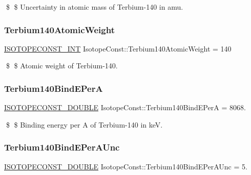 \$ \$ Uncertainty in atomic mass of Terbium-\/140 in amu. \mbox{\label{group___isotope_const-_terbium-_tb140_gac3b310ffa2ebbb7609a6ab63e2a7478f}} 
\subsubsection{\texorpdfstring{Terbium140\+Atomic\+Weight}{Terbium140AtomicWeight}}
{\footnotesize\ttfamily \mbox{\hyperlink{group___isotope_const-_macros_ga5f18360b3e99483a35c32d789e62621c}{I\+S\+O\+T\+O\+P\+E\+C\+O\+N\+S\+T\+\_\+\+I\+NT}} Isotope\+Const\+::\+Terbium140\+Atomic\+Weight = 140}

\$ \$ Atomic weight of Terbium-\/140. \mbox{\label{group___isotope_const-_terbium-_tb140_ga7da150e6aae3230c958360f226b26b5b}} 
\subsubsection{\texorpdfstring{Terbium140\+Bind\+E\+PerA}{Terbium140BindEPerA}}
{\footnotesize\ttfamily \mbox{\hyperlink{group___isotope_const-_macros_ga8f45a7272ce02c0b4c65c44636ed719a}{I\+S\+O\+T\+O\+P\+E\+C\+O\+N\+S\+T\+\_\+\+D\+O\+U\+B\+LE}} Isotope\+Const\+::\+Terbium140\+Bind\+E\+PerA = 8068.}

\$ \$ Binding energy per A of Terbium-\/140 in keV. \mbox{\label{group___isotope_const-_terbium-_tb140_gaa076150bcac984780f8074cc2b26eb50}} 
\subsubsection{\texorpdfstring{Terbium140\+Bind\+E\+Per\+A\+Unc}{Terbium140BindEPerAUnc}}
{\footnotesize\ttfamily \mbox{\hyperlink{group___isotope_const-_macros_ga8f45a7272ce02c0b4c65c44636ed719a}{I\+S\+O\+T\+O\+P\+E\+C\+O\+N\+S\+T\+\_\+\+D\+O\+U\+B\+LE}} Isotope\+Const\+::\+Terbium140\+Bind\+E\+Per\+A\+Unc = 5.}

